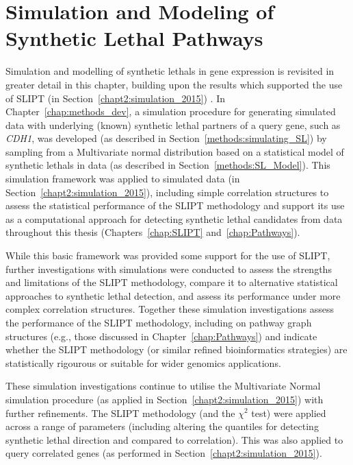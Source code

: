 \chapter{Simulation and Modeling of Synthetic Lethal Pathways}
\label{chap:simulation}

Simulation and modelling of \glspl{synthetic lethal} in \gls{gene expression} is revisited in greater detail in this chapter, building upon the results which supported the use of \gls{SLIPT} (in Section~\ref{chapt2:simulation_2015}) . In Chapter~\ref{chap:methods_dev}, a simulation procedure for generating simulated data with underlying (known) \gls{synthetic lethal} partners of a query gene, such as \textit{CDH1}, was developed (as described in Section~\ref{methods:simulating_SL}) by sampling from a Multivariate normal distribution based on a statistical model of \glspl{synthetic lethal} in  data (as described in Section~\ref{methods:SL_Model}). This simulation framework was applied to simulated data (in Section~\ref{chapt2:simulation_2015}), including simple correlation structures to assess the statistical performance of the \gls{SLIPT} methodology and support its use as a computational approach for detecting \gls{synthetic lethal} candidates from  data throughout this thesis (Chapters~\ref{chap:SLIPT} and~\ref{chap:Pathways}). 

While this basic framework was provided some support for the use of \gls{SLIPT}, further investigations with simulations were conducted to assess the strengths and limitations of the \gls{SLIPT} methodology, compare it to alternative statistical approaches to \gls{synthetic lethal} detection, and assess its performance under more complex correlation structures. Together these simulation investigations assess the performance of the \gls{SLIPT} methodology, including on pathway \gls{graph} structures (e.g., those discussed in Chapter~\ref{chap:Pathways}) and indicate whether the \gls{SLIPT} methodology (or similar refined \gls{bioinformatics} strategies) are statistically rigourous or suitable for wider \glspl{genomic} applications.

These simulation investigations continue to utilise the Multivariate Normal simulation procedure (as applied in Section~\ref{chapt2:simulation_2015}) with further refinements. The \gls{SLIPT} methodology (and the $\chi^2$ test) were applied across a range of parameters (including altering the quantiles for detecting \gls{synthetic lethal} direction and compared to correlation). This was also applied to query correlated genes (as performed in Section~\ref{chapt2:simulation_2015}).

